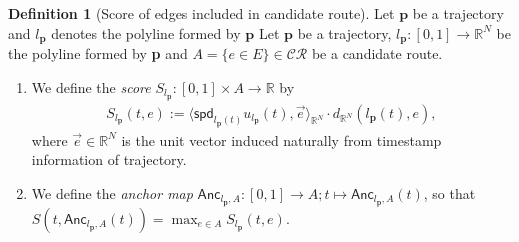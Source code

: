 \documentclass{article}
\numberwithin{equation}{section}
\theoremstyle{definition}
\newtheorem{definition}{Definition}[section]
\newtheorem{remark}[remark]{Remark}
\newcommand{\CR}{\mathcal{CR}}
\newcommand{\R}{\mathbb{R}}
\newcommand{\spd}{\mathsf{spd}}
\begin{document}
\begin{definition}[Score of edges included in candidate route]  
    Let $\mathbf{p}$ be a trajectory and $l_\mathbf{p}$ denotes the polyline formed by $\mathbf{p}$
    Let $\textbf{p}$ be a trajectory, $l_{\textbf{p}}:[0,1]\to\R^{N}$ be the polyline formed by \textbf{p} and $A=\{e\in E\}\in\CR$ be a candidate route.
    \begin{enumerate}
        \item
        We define the \emph{score} $S_{l_{\textbf{p}}}:[0,1]\times A\to\R$ by
        \begin{align}
            S_{l_{\textbf{p}}}(t,e) := \langle \spd_{l_{\textbf{p}}(t)}u_{l_{\textbf{p}}}(t),\Vec{e} \rangle_{\R^{N}}\cdot d_{\R^{N}}(l_{\textbf{p}}(t),e),
        \end{align}
        where $\Vec{e}\in\R^{N}$ is the unit vector induced naturally from timestamp information of trajectory. 
        \item
        We define the \emph{anchor map} $\mathsf{Anc}_{l_{\mathbf{p}},A}:[0,1]\to A ; t\mapsto \mathsf{Anc}_{l_{\mathbf{p}},A}(t)$, so that $S(t,\mathsf{Anc}_{l_{\mathbf{p}},A}(t)) = \max_{e\in A}S_{l_{\textbf{p}}}(t,e)$.
    \end{enumerate}
    
\end{definition}    

\end{document}
